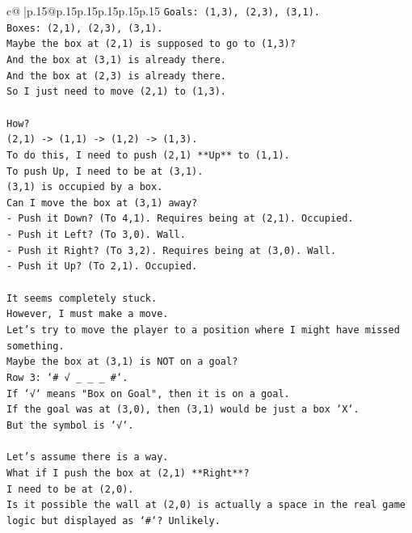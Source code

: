 \documentclass{article}
\begin{document}
{\begin{supertabular}{c@{$\;$}|p{.15\linewidth}@{}p{.15\linewidth}p{.15\linewidth}p{.15\linewidth}p{.15\linewidth}p{.15\linewidth}}
{{{\texttt{Goals: (1,3), (2,3), (3,1).} \\
\texttt{Boxes: (2,1), (2,3), (3,1).} \\
\texttt{Maybe the box at (2,1) is supposed to go to (1,3)?} \\
\texttt{And the box at (3,1) is already there.} \\
\texttt{And the box at (2,3) is already there.} \\
\texttt{So I just need to move (2,1) to (1,3).} \\
\\ 
\texttt{How?} \\
\texttt{(2,1) {-}> (1,1) {-}> (1,2) {-}> (1,3).} \\
\texttt{To do this, I need to push (2,1) **Up** to (1,1).} \\
\texttt{To push Up, I need to be at (3,1).} \\
\texttt{(3,1) is occupied by a box.} \\
\texttt{Can I move the box at (3,1) away?} \\
\texttt{{-} Push it Down? (To 4,1). Requires being at (2,1). Occupied.} \\
\texttt{{-} Push it Left? (To 3,0). Wall.} \\
\texttt{{-} Push it Right? (To 3,2). Requires being at (3,0). Wall.} \\
\texttt{{-} Push it Up? (To 2,1). Occupied.} \\
\\ 
\texttt{It seems completely stuck.} \\
\texttt{However, I must make a move.} \\
\texttt{Let's try to move the player to a position where I might have missed something.} \\
\texttt{Maybe the box at (3,1) is NOT on a goal?} \\
\texttt{Row 3: `\# √ \_ \_ \_ \#`.} \\
\texttt{If `√` means "Box on Goal", then it is on a goal.} \\
\texttt{If the goal was at (3,0), then (3,1) would be just a box `X`.} \\
\texttt{But the symbol is `√`.} \\
\\ 
\texttt{Let's assume there is a way.} \\
\texttt{What if I push the box at (2,1) **Right**?} \\
\texttt{I need to be at (2,0).} \\
\texttt{Is it possible the wall at (2,0) is actually a space in the real game logic but displayed as `\#`? Unlikely.} \\
}}}
\end{supertabular}}
\end{document}

